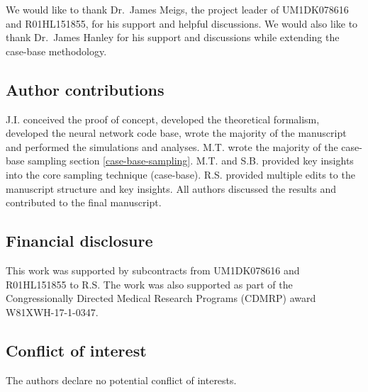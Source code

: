 \documentclass[preprint,12pt,authoryear]{elsarticle}
\begin{document}
We would like to thank Dr.~James Meigs, the project leader of UM1DK078616 and R01HL151855, for his support and helpful discussions.
We would also like to thank Dr.~James Hanley for his support and discussions while extending the case-base methodology.

\subsection*{Author contributions}

J.I. conceived the proof of concept, developed the theoretical formalism, developed the neural network code base,
wrote the majority of the manuscript and performed the simulations and analyses. M.T. wrote the majority of the case-base sampling section \ref{case-base-sampling}.
M.T. and S.B. provided key insights into the core sampling technique (case-base). R.S. provided multiple edits to the manuscript structure and key insights. All authors
discussed the results and contributed to the final manuscript.

\subsection*{Financial disclosure}

This work was supported by subcontracts from UM1DK078616 and R01HL151855
to R.S. The work was also supported as part of the Congressionally Directed Medical Research Programs (CDMRP) award W81XWH-17-1-0347.
\subsection*{Conflict of interest}

The authors declare no potential conflict of interests.


  
 





\end{document}

